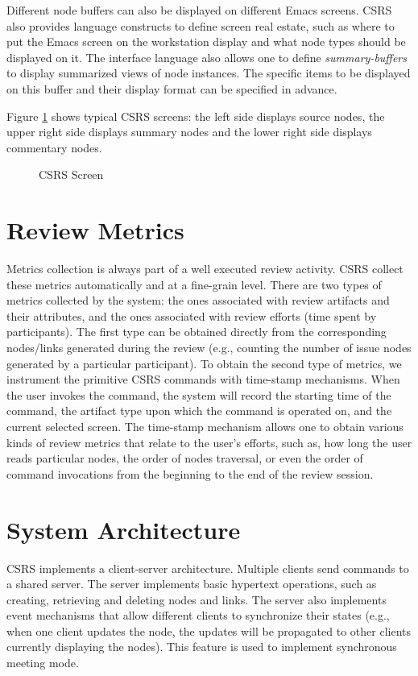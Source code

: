 Different node buffers can also be displayed on different Emacs screens. 
CSRS also provides language constructs to define screen real estate,
such as where to put the Emacs screen on the workstation display and
what node types should be displayed on it.
The interface language also allows one to define
{\it summary-buffers} to display summarized views of node instances. 
The specific items to be displayed on this buffer and their display
format can be specified in advance. 

Figure \ref{fig:csrs-screen} shows typical CSRS screens: the left
side displays source nodes, the upper right side displays summary
nodes and the lower right side displays commentary nodes.

\begin{figure}[h]
  \begin{center}
  \end{center}
  \caption{CSRS Screen}
  \label{fig:csrs-screen}
\end{figure}

\section{Review Metrics}
Metrics collection is always part of a well executed review activity.
CSRS collect these metrics automatically and at a
fine-grain level. There are two types of metrics collected by
the system: the ones associated with review artifacts and their
attributes, and the ones associated with review efforts (time spent by
participants).  The first type can be obtained directly
from the corresponding nodes/links generated during the review
(e.g., counting the number of issue nodes generated by a
particular participant). To obtain the second type of metrics, we
instrument the primitive CSRS commands with time-stamp
mechanisms. When the user 
invokes the command, the system will record the starting time of the
command, the artifact type upon which the command is operated on, and the
current selected screen. 
The time-stamp mechanism allows one to obtain various kinds of
review metrics that relate to the user's efforts, such as, how long the
user reads particular nodes, the order of nodes traversal,
or even the order of command invocations from the beginning to
the end of the review session.

\section{System Architecture}
CSRS implements a client-server architecture. Multiple clients send
commands to a shared server. 
The server implements basic hypertext operations,
such as creating, retrieving and deleting nodes and links.
The server also implements event mechanisms
that allow different clients to synchronize their states (e.g., when one
client updates the node, the updates will be propagated to other clients
currently displaying the nodes). This  feature is used to
implement synchronous meeting mode.

